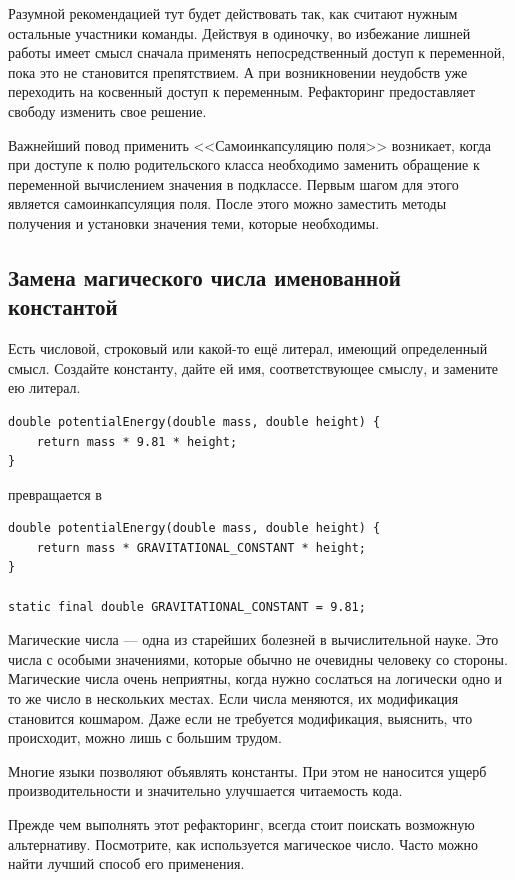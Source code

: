 \documentclass{../../text-style}
\begin{document}
Разумной рекомендацией тут будет действовать так, как считают нужным остальные участники команды. Действуя в одиночку, во избежание лишней работы имеет смысл сначала применять непосредственный доступ к переменной, пока это не становится препятствием. А при возникновении неудобств уже переходить на косвенный доступ к переменным. Рефакторинг предоставляет свободу изменить свое решение.

Важнейший повод применить <<Самоинкапсуляцию поля>> возникает, когда при доступе к полю родительского класса необходимо заменить обращение к переменной вычислением значения в подклассе. Первым шагом для этого является самоинкапсуляция поля. После этого можно заместить методы получения и установки значения теми, которые необходимы.

\subsection{Замена магического числа именованной константой}

Есть числовой, строковый или какой-то ещё литерал, имеющий определенный смысл. Создайте константу, дайте ей имя, соответствующее смыслу, и замените ею литерал.

\begin{verbatim}
double potentialEnergy(double mass, double height) {
    return mass * 9.81 * height;
}
\end{verbatim}

превращается в 

\begin{verbatim}
double potentialEnergy(double mass, double height) {
    return mass * GRAVITATIONAL_CONSTANT * height;
}

static final double GRAVITATIONAL_CONSTANT = 9.81;
\end{verbatim}

Магические числа --- одна из старейших болезней в вычислительной науке. Это числа с особыми значениями, которые обычно не очевидны человеку со стороны. Магические числа очень неприятны, когда нужно сослаться на логически одно и то же число в нескольких местах. Если числа меняются, их модификация становится кошмаром. Даже если не требуется модификация, выяснить, что происходит, можно лишь с большим трудом.

Многие языки позволяют объявлять константы. При этом не наносится ущерб производительности и значительно улучшается читаемость кода.

Прежде чем выполнять этот рефакторинг, всегда стоит поискать возможную альтернативу. Посмотрите, как используется магическое число. Часто можно найти лучший способ его применения.
\end{document}
